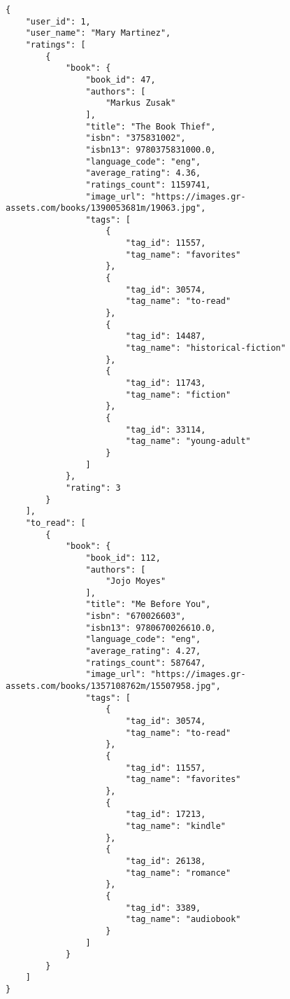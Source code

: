 \documentclass[11pt]{article}
\begin{document}
\begin{verbatim}
{
    "user_id": 1,
    "user_name": "Mary Martinez",
    "ratings": [
        {
            "book": {
                "book_id": 47,
                "authors": [
                    "Markus Zusak"
                ],
                "title": "The Book Thief",
                "isbn": "375831002",
                "isbn13": 9780375831000.0,
                "language_code": "eng",
                "average_rating": 4.36,
                "ratings_count": 1159741,
                "image_url": "https://images.gr-assets.com/books/1390053681m/19063.jpg",
                "tags": [
                    {
                        "tag_id": 11557,
                        "tag_name": "favorites"
                    },
                    {
                        "tag_id": 30574,
                        "tag_name": "to-read"
                    },
                    {
                        "tag_id": 14487,
                        "tag_name": "historical-fiction"
                    },
                    {
                        "tag_id": 11743,
                        "tag_name": "fiction"
                    },
                    {
                        "tag_id": 33114,
                        "tag_name": "young-adult"
                    }
                ]
            },
            "rating": 3
        }
    ],
    "to_read": [
        {
            "book": {
                "book_id": 112,
                "authors": [
                    "Jojo Moyes"
                ],
                "title": "Me Before You",
                "isbn": "670026603",
                "isbn13": 9780670026610.0,
                "language_code": "eng",
                "average_rating": 4.27,
                "ratings_count": 587647,
                "image_url": "https://images.gr-assets.com/books/1357108762m/15507958.jpg",
                "tags": [
                    {
                        "tag_id": 30574,
                        "tag_name": "to-read"
                    },
                    {
                        "tag_id": 11557,
                        "tag_name": "favorites"
                    },
                    {
                        "tag_id": 17213,
                        "tag_name": "kindle"
                    },
                    {
                        "tag_id": 26138,
                        "tag_name": "romance"
                    },
                    {
                        "tag_id": 3389,
                        "tag_name": "audiobook"
                    }
                ]
            }
        }
    ]
}
\end{verbatim}
\end{document}
